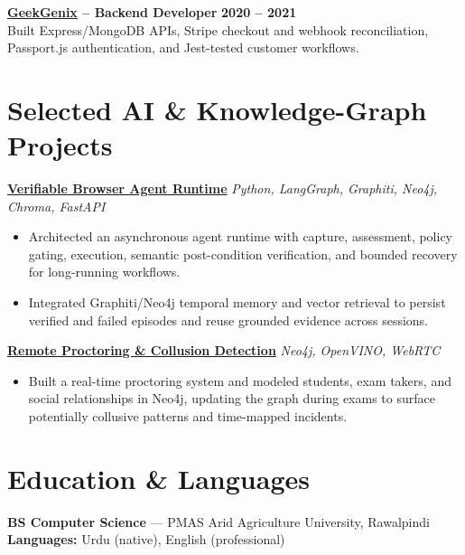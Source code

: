 \documentclass[10pt,letterpaper]{article}
\begin{document}
\vspace{2pt}

\textbf{\href{https://www.geekgenix.com/}{GeekGenix} -- Backend Developer}
\hfill
\textbf{2020 -- 2021}\\[-1pt]
Built Express/MongoDB APIs, Stripe checkout and webhook reconciliation,
Passport.js authentication, and Jest-tested customer workflows.

\section*{Selected AI \& Knowledge-Graph Projects}

\textbf{
  \href{https://github.com/adnahmed/verifiable-browser-agent}
       {Verifiable Browser Agent Runtime}
}
\hfill
\textit{Python, LangGraph, Graphiti, Neo4j, Chroma, FastAPI}

\begin{itemize}
  \item Architected an asynchronous agent runtime with capture, assessment,
  policy gating, execution, semantic post-condition verification, and bounded
  recovery for long-running workflows.

  \item Integrated Graphiti/Neo4j temporal memory and vector retrieval to
  persist verified and failed episodes and reuse grounded evidence across
  sessions.
\end{itemize}

\vspace{1pt}

\textbf{
  \href{https://github.com/adnahmed/remote-proctoring-system-backend}
       {Remote Proctoring \& Collusion Detection}
}
\hfill
\textit{Neo4j, OpenVINO, WebRTC}\\[-1pt]

\begin{itemize}
  \item Built a real-time proctoring system and modeled students, exam takers,
  and social relationships in Neo4j, updating the graph during exams to surface
  potentially collusive patterns and time-mapped incidents.
\end{itemize}

\section*{Education \& Languages}
\textbf{BS Computer Science} ---
PMAS Arid Agriculture University, Rawalpindi
\hfill
\textbf{Languages:} Urdu (native), English (professional)
\end{document}

